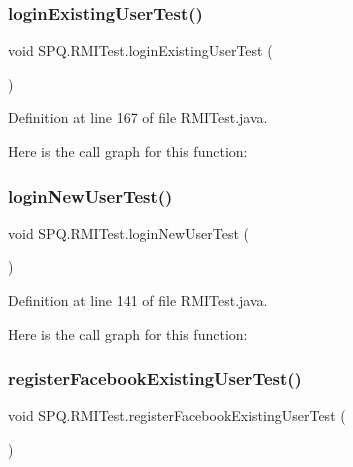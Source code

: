 \subsubsection{\texorpdfstring{login\+Existing\+User\+Test()}{loginExistingUserTest()}}
{\footnotesize\ttfamily void S\+P\+Q.\+R\+M\+I\+Test.\+login\+Existing\+User\+Test (\begin{DoxyParamCaption}{ }\end{DoxyParamCaption})}



Definition at line 167 of file R\+M\+I\+Test.\+java.

Here is the call graph for this function\+:
\mbox{\label{class_s_p_q_1_1_r_m_i_test_a07409afe054b3fd3ee0481236e45b680}} 
\subsubsection{\texorpdfstring{login\+New\+User\+Test()}{loginNewUserTest()}}
{\footnotesize\ttfamily void S\+P\+Q.\+R\+M\+I\+Test.\+login\+New\+User\+Test (\begin{DoxyParamCaption}{ }\end{DoxyParamCaption})}



Definition at line 141 of file R\+M\+I\+Test.\+java.

Here is the call graph for this function\+:
\mbox{\label{class_s_p_q_1_1_r_m_i_test_aebfcce491b9fa13cafa971bac73f88b8}} 
\subsubsection{\texorpdfstring{register\+Facebook\+Existing\+User\+Test()}{registerFacebookExistingUserTest()}}
{\footnotesize\ttfamily void S\+P\+Q.\+R\+M\+I\+Test.\+register\+Facebook\+Existing\+User\+Test (\begin{DoxyParamCaption}{ }\end{DoxyParamCaption})}



